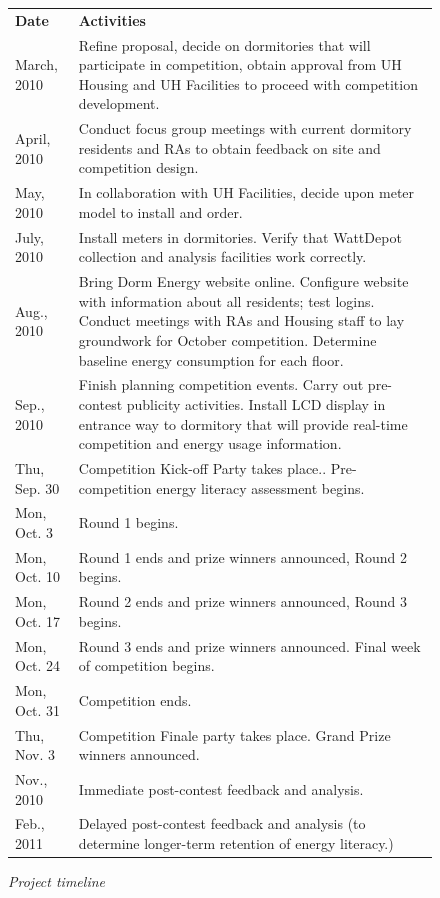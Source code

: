\documentclass[11pt]{article}
\begin{document}
\begin{figure}[!ht]
\small
\begin{tabular}{p{1in}p{5in}} \hline
{\bf Date} & {\bf Activities}  \\
March, 2010 &  Refine proposal, decide on dormitories that will
participate in competition, obtain approval from UH Housing and UH Facilities to proceed with competition development. \\

April, 2010 & Conduct focus group meetings with current
dormitory residents and RAs to obtain feedback on site and competition
design. \\

May, 2010 &  In collaboration with UH Facilities, decide upon meter model to install and order. \\

July, 2010 & Install meters in dormitories.  Verify that WattDepot collection and analysis facilities work correctly. \\

Aug., 2010 & Bring Dorm Energy website online.  Configure website with information about all residents; test logins.  Conduct meetings with RAs and Housing staff to lay groundwork for October competition. Determine baseline energy consumption for each floor.\\

Sep., 2010 & Finish planning competition events.  Carry out pre-contest publicity activities.  Install LCD display in entrance way to dormitory that will provide real-time competition and energy usage information.    \\

Thu, Sep. 30 & Competition Kick-off Party takes place..  Pre-competition energy literacy assessment begins. \\

Mon, Oct. 3 & Round 1 begins. \\

Mon, Oct. 10 & Round 1 ends and prize winners announced, Round 2 begins. \\

Mon, Oct. 17 & Round 2 ends and prize winners announced, Round 3 begins. \\

Mon, Oct. 24 & Round 3 ends and prize winners announced. Final week of competition begins. \\

Mon, Oct. 31 & Competition ends.  \\

Thu, Nov. 3 & Competition Finale party takes place. Grand Prize winners announced. \\

Nov., 2010 &  Immediate post-contest feedback and analysis.  \\

Feb., 2011 &  Delayed post-contest feedback and analysis (to determine longer-term retention of energy literacy.)  \\ \hline
\end{tabular} 
\normalsize
\caption{{\em Project timeline}}
\label{fig:timeline}
\end{figure}
\end{document}
